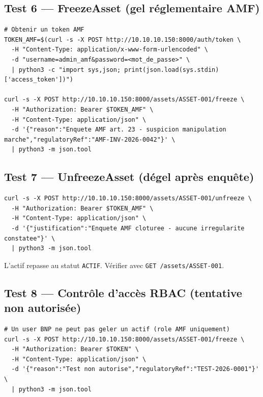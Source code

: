 \documentclass[12pt,a4paper,french]{article}
\begin{document}
\subsection{Test 6 — FreezeAsset (gel réglementaire AMF)}

\begin{lstlisting}[style=bash]
# Obtenir un token AMF
TOKEN_AMF=$(curl -s -X POST http://10.10.10.150:8000/auth/token \
  -H "Content-Type: application/x-www-form-urlencoded" \
  -d "username=admin_amf&password=<mot_de_passe>" \
  | python3 -c "import sys,json; print(json.load(sys.stdin)['access_token'])")

curl -s -X POST http://10.10.10.150:8000/assets/ASSET-001/freeze \
  -H "Authorization: Bearer $TOKEN_AMF" \
  -H "Content-Type: application/json" \
  -d '{"reason":"Enquete AMF art. 23 - suspicion manipulation marche","regulatoryRef":"AMF-INV-2026-0042"}' \
  | python3 -m json.tool
\end{lstlisting}

\subsection{Test 7 — UnfreezeAsset (dégel après enquête)}

\begin{lstlisting}[style=bash]
curl -s -X POST http://10.10.10.150:8000/assets/ASSET-001/unfreeze \
  -H "Authorization: Bearer $TOKEN_AMF" \
  -H "Content-Type: application/json" \
  -d '{"justification":"Enquete AMF cloturee - aucune irregularite constatee"}' \
  | python3 -m json.tool
\end{lstlisting}

\begin{successbox}
L'actif repasse au statut \texttt{ACTIF}. Vérifier avec \texttt{GET /assets/ASSET-001}.
\end{successbox}

\subsection{Test 8 — Contrôle d'accès RBAC (tentative non autorisée)}

\begin{lstlisting}[style=bash]
# Un user BNP ne peut pas geler un actif (role AMF uniquement)
curl -s -X POST http://10.10.10.150:8000/assets/ASSET-001/freeze \
  -H "Authorization: Bearer $TOKEN" \
  -H "Content-Type: application/json" \
  -d '{"reason":"Test non autorise","regulatoryRef":"TEST-2026-0001"}' \
  | python3 -m json.tool
\end{lstlisting}
\end{document}
